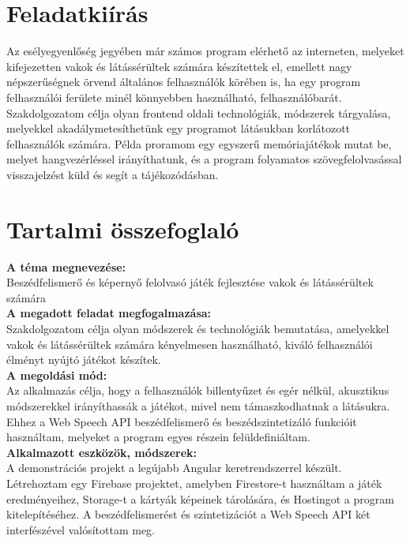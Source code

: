 \documentclass[12pt]{report}
\begin{document}
\renewcommand{\contentsname}{Tartalomjegyzék}

\chapter*{Feladatkiírás}

Az esélyegyenlőség jegyében már számos program elérhető az interneten, melyeket kifejezetten vakok és látássérültek számára készítettek el, emellett nagy népszerűségnek örvend általános felhasználók körében is, ha egy program felhasználói ferülete minél könnyebben használható, felhasználóbarát. Szakdolgozatom célja olyan frontend oldali technológiák, módszerek tárgyalása, melyekkel akadálymetesíthetünk egy programot látásukban korlátozott felhasználók számára. Példa proramom egy egyszerű memóriajátékok mutat be, melyet hangvezérléssel irányíthatunk, és a program folyamatos szövegfelolvasással visszajelzést küld és segít a tájékozódásban.

\chapter*{Tartalmi összefoglaló}

\textbf{A téma megnevezése:} \\
\noindent Beszédfelismerő és képernyő felolvasó játék fejlesztése vakok és látássérültek számára\\

\noindent\textbf{A megadott feladat megfogalmazása:} \\
\noindent Szakdolgozatom célja olyan módszerek és technológiák bemutatása, amelyekkel vakok és látássérültek számára kényelmesen használható, kiváló felhasználói élményt nyújtó játékot készítek. \\

\noindent\textbf{A megoldási mód:} \\
\noindent Az alkalmazás célja, hogy a felhasználók billentyűzet és egér nélkül, akusztikus módszerekkel irányíthassák a játékot, mivel nem támaszkodhatnak a látásukra. Ehhez a Web Speech API beszédfelismerő és beszédszintetizáló funkcióit használtam, melyeket a program egyes részein felüldefiniáltam. \\

\noindent\textbf{Alkalmazott eszközök, módszerek:} \\
\noindent A demonstrációs projekt a legújabb Angular keretrendszerrel készült. Létrehoztam egy Firebase projektet, amelyben Firestore-t használtam a játék eredményeihez, Storage-t a kártyák képeinek tárolására, és Hostingot a program kitelepítéséhez. A beszédfelismerést és szintetizációt a Web Speech API két interfészével valósítottam meg. \\
\end{document}
